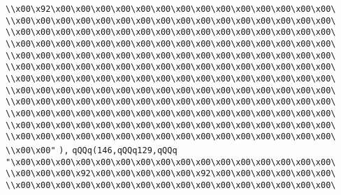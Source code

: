 \verb|\\x00\x92\x00\x00\x00\x00\x00\x00\x00\x00\x00\x00\x00\x00\x00\x00\|\newline
\verb|\\x00\x00\x00\x00\x00\x00\x00\x00\x00\x00\x00\x00\x00\x00\x00\x00\|\newline
\verb|\\x00\x00\x00\x00\x00\x00\x00\x00\x00\x00\x00\x00\x00\x00\x00\x00\|\newline
\verb|\\x00\x00\x00\x00\x00\x00\x00\x00\x00\x00\x00\x00\x00\x00\x00\x00\|\newline
\verb|\\x00\x00\x00\x00\x00\x00\x00\x00\x00\x00\x00\x00\x00\x00\x00\x00\|\newline
\verb|\\x00\x00\x00\x00\x00\x00\x00\x00\x00\x00\x00\x00\x00\x00\x00\x00\|\newline
\verb|\\x00\x00\x00\x00\x00\x00\x00\x00\x00\x00\x00\x00\x00\x00\x00\x00\|\newline
\verb|\\x00\x00\x00\x00\x00\x00\x00\x00\x00\x00\x00\x00\x00\x00\x00\x00\|\newline
\verb|\\x00\x00\x00\x00\x00\x00\x00\x00\x00\x00\x00\x00\x00\x00\x00\x00\|\newline
\verb|\\x00\x00\x00\x00\x00\x00\x00\x00\x00\x00\x00\x00\x00\x00\x00\x00\|\newline
\verb|\\x00\x00\x00\x00\x00\x00\x00\x00\x00\x00\x00\x00\x00\x00\x00\x00\|\newline
\verb|\\x00\x00\x00\x00\x00\x00\x00\x00\x00\x00\x00\x00\x00\x00\x00\x00\|\newline
\verb|\\x00\x00"|\newline
\verb|),|\newline
\verb|qQQq(146,qQQq129,qQQq|\newline
\verb|"\x00\x00\x00\x00\x00\x00\x00\x00\x00\x00\x00\x00\x00\x00\x00\x00\|\newline
\verb|\\x00\x00\x00\x92\x00\x00\x00\x00\x00\x92\x00\x00\x00\x00\x00\x00\|\newline
\verb|\\x00\x00\x00\x00\x00\x00\x00\x00\x00\x00\x00\x00\x00\x00\x00\x00\|\newline
